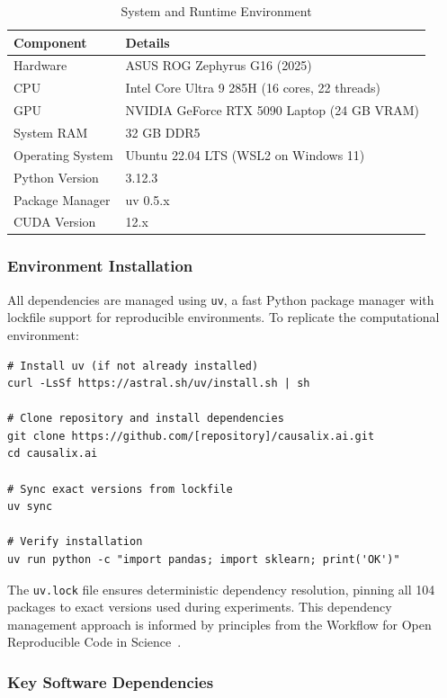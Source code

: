 \begin{table}[H]
\centering
\caption{System and Runtime Environment}
\label{tab:system_env}
\footnotesize
\begin{tabular}{@{}ll@{}}
\toprule
\textbf{Component} & \textbf{Details} \\
\midrule
Hardware & ASUS ROG Zephyrus G16 (2025) \\
CPU & Intel Core Ultra 9 285H (16 cores, 22 threads) \\
GPU & NVIDIA GeForce RTX 5090 Laptop (24 GB VRAM) \\
System RAM & 32 GB DDR5 \\
Operating System & Ubuntu 22.04 LTS (WSL2 on Windows 11) \\
Python Version & 3.12.3 \\
Package Manager & uv 0.5.x \\
CUDA Version & 12.x \\
\bottomrule
\end{tabular}
\end{table}

\subsubsection{Environment Installation}

All dependencies are managed using \texttt{uv}, a fast Python package manager with lockfile support for reproducible environments. To replicate the computational environment:

\begin{verbatim}
# Install uv (if not already installed)
curl -LsSf https://astral.sh/uv/install.sh | sh

# Clone repository and install dependencies
git clone https://github.com/[repository]/causalix.ai.git
cd causalix.ai

# Sync exact versions from lockfile
uv sync

# Verify installation
uv run python -c "import pandas; import sklearn; print('OK')"
\end{verbatim}

\noindent The \texttt{uv.lock} file ensures deterministic dependency resolution, pinning all 104 packages to exact versions used during experiments. This dependency management approach is informed by principles from the Workflow for Open Reproducible Code in Science~\cite{vanlissa2021worcs}.

\subsubsection{Key Software Dependencies}


